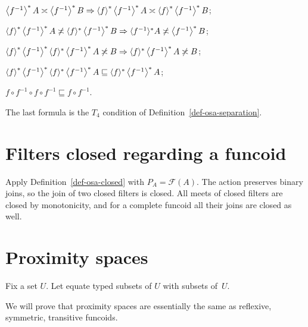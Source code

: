 $\left\langle f^{-1}\right\rangle ^{\ast} A \asymp \left\langle f^{-1}\right\rangle ^{\ast} B
\Rightarrow \left\langle f\right\rangle ^{\ast} \left\langle f^{-1}\right\rangle ^{\ast} A \asymp
\left\langle f\right\rangle ^{\ast} \left\langle f^{-1}\right\rangle ^{\ast} B$;

$\left\langle f\right\rangle ^{\ast} \left\langle f^{-1}\right\rangle ^{\ast} A \not\asymp \langle f
\rangle^{\ast} \left\langle f^{-1}\right\rangle ^{\ast} B \Rightarrow \langle f^{- 1}
\rangle^{\ast} A \not\asymp \left\langle f^{-1}\right\rangle ^{\ast} B$;

$\left\langle f\right\rangle ^{\ast} \left\langle f^{-1}\right\rangle ^{\ast} \langle f
\rangle^{\ast} \left\langle f^{-1}\right\rangle ^{\ast} A \not\asymp B \Rightarrow \langle
f \rangle^{\ast} \left\langle f^{-1}\right\rangle ^{\ast} A \not\asymp B$;

$\left\langle f\right\rangle ^{\ast} \left\langle f^{-1}\right\rangle ^{\ast} \langle f
\rangle^{\ast} \left\langle f^{-1}\right\rangle ^{\ast} A \sqsubseteq \langle f
\rangle^{\ast} \left\langle f^{-1}\right\rangle ^{\ast} A$;

$f \circ f^{- 1} \circ f \circ f^{- 1} \sqsubseteq f \circ f^{- 1}$.

The last formula is the $T_4$ condition of Definition~\ref{def-osa-separation}.

\section{Filters closed regarding a funcoid}
Apply Definition~\ref{def-osa-closed} with $P_A=\mathscr F(A)$.
The action preserves binary joins, so the join of two closed filters
is closed. All meets of closed filters are closed by monotonicity,
and for a complete funcoid all their joins are closed as well.

\section{Proximity spaces}

Fix a set $U$. Let equate typed subsets of $U$ with subsets of~$U$.

We will prove that proximity spaces are essentially the same as reflexive,
symmetric, transitive funcoids.

